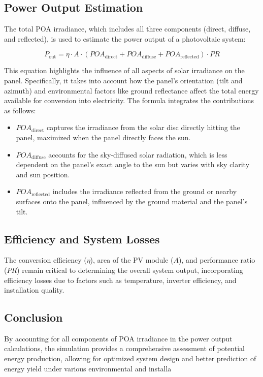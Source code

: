 \subsection{Power Output Estimation}
The total POA irradiance, which includes all three components (direct, diffuse, and reflected), is used to estimate the power output of a photovoltaic system:

\begin{equation}
P_{\text{out}} = \eta \cdot A \cdot (POA_{\text{direct}} + POA_{\text{diffuse}} + POA_{\text{reflected}}) \cdot PR
\label{eq:pv_power_output}
\end{equation}

This equation highlights the influence of all aspects of solar irradiance on the panel. Specifically, it takes into account how the panel's orientation (tilt and azimuth) and environmental factors like ground reflectance affect the total energy available for conversion into electricity. The formula integrates the contributions as follows:

\begin{itemize}
    \item \( POA_{\text{direct}} \) captures the irradiance from the solar disc directly hitting the panel, maximized when the panel directly faces the sun.
    \item \( POA_{\text{diffuse}} \) accounts for the sky-diffused solar radiation, which is less dependent on the panel's exact angle to the sun but varies with sky clarity and sun position.
    \item \( POA_{\text{reflected}} \) includes the irradiance reflected from the ground or nearby surfaces onto the panel, influenced by the ground material and the panel's tilt.
\end{itemize}

\subsection{Efficiency and System Losses}
The conversion efficiency (\( \eta \)), area of the PV module (\( A \)), and performance ratio (\( PR \)) remain critical to determining the overall system output, incorporating efficiency losses due to factors such as temperature, inverter efficiency, and installation quality.

\subsection{Conclusion}
By accounting for all components of POA irradiance in the power output calculations, the simulation provides a comprehensive assessment of potential energy production, allowing for optimized system design and better prediction of energy yield under various environmental and installa
